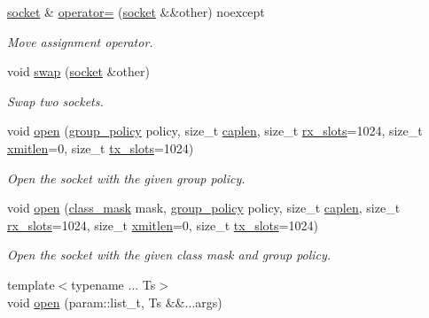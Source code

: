 \begin{DoxyCompactItemize}
\hyperlink{classpfq_1_1socket}{socket} \& \hyperlink{classpfq_1_1socket_a8022eafa68b84a840292ebcfc4d1ba7a}{operator=} (\hyperlink{classpfq_1_1socket}{socket} \&\&other) noexcept
\begin{DoxyCompactList}\small\item\em Move assignment operator. \end{DoxyCompactList}\item 
void \hyperlink{classpfq_1_1socket_ac80ebddf3a94f7964c74bf02954704ce}{swap} (\hyperlink{classpfq_1_1socket}{socket} \&other)
\begin{DoxyCompactList}\small\item\em Swap two sockets. \end{DoxyCompactList}\item 
void \hyperlink{classpfq_1_1socket_ae9ed7e81f5aaa789417fe4eff43a1f5a}{open} (\hyperlink{namespacepfq_ac41249c8510558905b01fa4d866a38d7}{group\+\_\+policy} policy, size\+\_\+t \hyperlink{classpfq_1_1socket_ab68dbba5ef01041b9c96758c4a9f0a6c}{caplen}, size\+\_\+t \hyperlink{classpfq_1_1socket_a5cf700fc12d67b91df3d669ac4aa737a}{rx\+\_\+slots}=1024, size\+\_\+t \hyperlink{classpfq_1_1socket_a142d9760fcef01b426c3afb4005400d9}{xmitlen}=0, size\+\_\+t \hyperlink{classpfq_1_1socket_a019d15a072c043d6a1333ca0c836da4c}{tx\+\_\+slots}=1024)
\begin{DoxyCompactList}\small\item\em Open the socket with the given group policy. \end{DoxyCompactList}\item 
void \hyperlink{classpfq_1_1socket_a192d3e67f6943f71ed3d7e4012eb29ee}{open} (\hyperlink{namespacepfq_a96af1f5ed530eff563eb917516758fbb}{class\+\_\+mask} mask, \hyperlink{namespacepfq_ac41249c8510558905b01fa4d866a38d7}{group\+\_\+policy} policy, size\+\_\+t \hyperlink{classpfq_1_1socket_ab68dbba5ef01041b9c96758c4a9f0a6c}{caplen}, size\+\_\+t \hyperlink{classpfq_1_1socket_a5cf700fc12d67b91df3d669ac4aa737a}{rx\+\_\+slots}=1024, size\+\_\+t \hyperlink{classpfq_1_1socket_a142d9760fcef01b426c3afb4005400d9}{xmitlen}=0, size\+\_\+t \hyperlink{classpfq_1_1socket_a019d15a072c043d6a1333ca0c836da4c}{tx\+\_\+slots}=1024)
\begin{DoxyCompactList}\small\item\em Open the socket with the given class mask and group policy. \end{DoxyCompactList}\item 
{\footnotesize template$<$typename ... Ts$>$ }\\void \hyperlink{classpfq_1_1socket_a33c3e305c62f5a9f8a0ef74f69097ecf}{open} (param\+::list\+\_\+t, Ts \&\&...args)

\end{DoxyCompactItemize}
